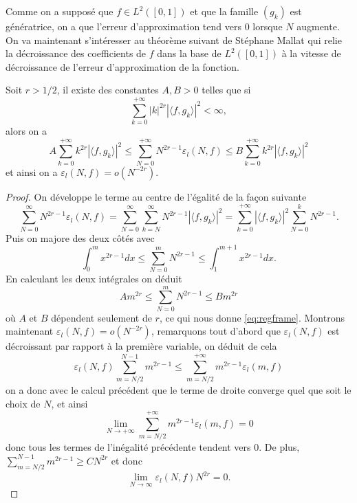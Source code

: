 Comme on a supposé que $f\in L^2([0, 1])$ et que la famille $(g_k)$ est génératrice, on a que l'erreur d'approximation tend vers $0$ lorsque $N$ augmente.
On va maintenant s'intéresser au théorème suivant de Stéphane Mallat qui relie la décroissance des coefficients de $f$ dans la base de $L^2([0, 1])$ à la vitesse de décroissance de l'erreur d'approximation de la fonction.
\begin{theoreme}
	Soit $r > 1/2$, il existe des constantes $A, B > 0$ telles que si 
	\begin{equation}
		\sum_{k=0}^{+\infty} |k|^{2r}|\langle f, g_k \rangle |^2 < \infty,
	\end{equation}
	alors on a 
	\begin{equation}\label{eq:regframe}
		A \sum_{k=0}^{+\infty} k^{2r}|\langle f, g_k \rangle |^2 \leq 
		\sum_{N=0}^{+\infty} N^{2r-1} \varepsilon_l(N, f) \leq
		B \sum_{k=0}^{+\infty} k^{2r} |\langle f, g_k\rangle |^2
	\end{equation}
	et ainsi on a $\varepsilon_l(N, f) = o(N^{-2r})$.
\end{theoreme}
\begin{proof}
	On développe le terme au centre de l'égalité de la façon suivante 
	\begin{equation*}
		\sum_{N=0}^{\infty} N^{2r-1} \varepsilon_l(N, f) =
		\sum_{N=0}^{\infty} \sum_{k=N}^{\infty} N^{2r-1} |\langle f, g_k \rangle |^2 =
		\sum_{k=0}^{+\infty} |\langle f, g_k \rangle |^2 \sum_{N=0}^{k} N^{2r-1}.
	\end{equation*}
	Puis on majore des deux côtés avec 
	\begin{equation}
		\int_{0}^m x^{2r-1} dx \leq \sum_{N=0}^m N^{2r-1} \leq \int_{1}^{m+1} x^{2r-1}dx.
	\end{equation}
	En calculant les deux intégrales on déduit 
	\begin{equation}
		A m^{2r} \leq \sum_{N=0}^{m} N^{2r-1} \leq B m^{2r}
	\end{equation}
	où $A$ et $B$ dépendent seulement de $r$, ce qui nous donne \ref{eq:regframe}.
	Montrons maintenant $\varepsilon_l(N, f) = o(N^{-2r})$, remarquons tout d'abord que $\varepsilon_l(N, f)$ est décroissant par rapport à la première variable, on déduit de cela
	\begin{equation*}
		\varepsilon_l(N, f)\sum_{m=N/2}^{N-1} m^{2r-1} \leq \sum_{m=N/2}^{+\infty} m^{2r-1} \varepsilon_l(m, f)
	\end{equation*}
	on a donc avec le calcul précédent que le terme de droite converge quel que soit le choix de $N$, et ainsi
	\begin{equation*}
		\lim_{N \to +\infty} \sum_{m=N/2}^{+\infty} m^{2r-1}\varepsilon_l(m, f) = 0
	\end{equation*}
	donc tous les termes de l'inégalité précédente tendent vers 0. 
	De plus, $\sum_{m = N/2}^{N-1} m^{2r-1} \geq CN^{2r}$ et donc
	\begin{equation*}
		\lim_{N\to \infty} \varepsilon_l(N, f)N^{2r} = 0.
	\end{equation*}
\end{proof}
